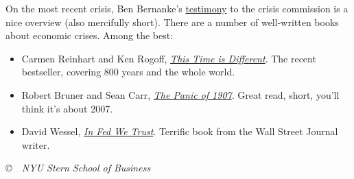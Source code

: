 \documentclass[letterpaper,12pt]{article}
\begin{document}
On the most recent crisis, Ben Bernanke's
\href{http://www.federalreserve.gov/newsevents/testimony/bernanke20100902a.htm}
{testimony} to the crisis commission is a nice overview (also mercifully short).
There are a number of well-written books about economic crises.
Among the best:
%
\begin{itemize}
\item Carmen Reinhart and Ken Rogoff,
\href{http://www.amazon.com/This-Time-Different-Centuries-ebook/dp/B004EYT932/}
{\it This Time is Different\/}.
The recent bestseller, covering 800 years and the whole world.

\item Robert Bruner and Sean Carr,
\href{http://www.amazon.com/Panic-1907-Lessons-Learned-Markets/dp/0470452587/}
{\it The Panic of 1907\/}.
Great read, short, you'll think it's about 2007.

\item David Wessel,
\href{http://www.amazon.com/Fed-We-Trust-Bernankes-Great/dp/0307459683/}
{\it In Fed We Trust\/}.
Terrific book from the Wall Street Journal writer.

\end{itemize}


\vfill \centerline{\it \copyright \ \number\year \ NYU Stern
School of Business}
\end{document}
